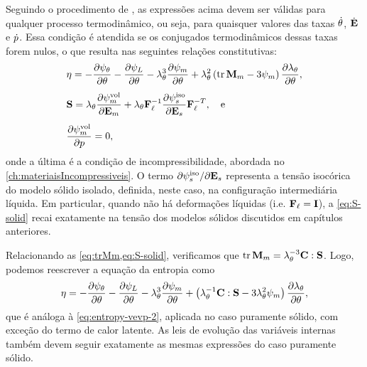 \documentclass[Tese.tex]{subfiles}
\begin{document}
Seguindo o procedimento de , as expressões acima devem ser válidas para qualquer processo termodinâmico, ou seja, para quaisquer valores das taxas $\dot{\theta}$, $\dot{\mathbf{E}}$ e $\dot{p}$. Essa condição é atendida se os conjugados termodinâmicos dessas taxas forem nulos, o que resulta nas seguintes relações constitutivas:
\begin{align}
&\eta = - \dfrac{\partial\psi_{\theta}}{\partial\theta} - \dfrac{\partial\psi_L}{\partial\theta} - \lambda_{\theta}^3\dfrac{\partial\psi_m}{\partial\theta} +  \lambda_{\theta}^2\left(\text{tr}\,\mathbf{M}_m - 3\psi_m\right)\dfrac{\partial\lambda_{\theta}}{\partial\theta}, \label{eq:entropy-solid} \\[0.15cm]
&\mathbf{S} = \lambda_{\theta}\dfrac{\partial\psi_m^\text{vol}}{\partial\mathbf{E}_m} + \lambda_{\theta}\mathbf{F}_\ell^{-1}\dfrac{\partial\psi_s^\text{iso}}{\partial\mathbf{E}_s}\mathbf{F}_\ell^{-T}, \text{\quad e} \label{eq:S-solid} \\[0.15cm]
&\dfrac{\partial\psi_m^\text{vol}}{\partial p} = 0, \label{eq:incompress-pc}
\end{align}
onde a última é a condição de incompressibilidade, abordada no \cref{ch:materiaisIncompressiveis}. O termo ${\partial\psi_s^\text{iso}}/{\partial\mathbf{E}_s}$ representa a tensão isocórica do modelo sólido isolado, definida, neste caso, na configuração intermediária líquida. Em particular, quando não há deformações líquidas (i.e. $\mathbf{F}_\ell=\mathbf{I}$), a \cref{eq:S-solid} recai exatamente na tensão dos modelos sólidos discutidos em capítulos anteriores.

Relacionando as \cref{eq:trMm,eq:S-solid}, verificamos que $\text{tr}\,\mathbf{M}_m = \lambda_{\theta}^{-3}\mathbf{C}:\mathbf{S}$. Logo, podemos reescrever a equação da entropia como
\begin{equation}
\eta = - \dfrac{\partial\psi_{\theta}}{\partial\theta} - \dfrac{\partial\psi_L}{\partial\theta} - \lambda_{\theta}^3\dfrac{\partial\psi_m}{\partial\theta} +  \left(\lambda_{\theta}^{-1}\mathbf{C}:\mathbf{S} - 3\lambda_{\theta}^2\psi_m\right)\dfrac{\partial\lambda_{\theta}}{\partial\theta}, \label{eq:entropy-solid-2}
\end{equation}
que é análoga à \cref{eq:entropy-vevp-2}, aplicada no caso puramente sólido, com exceção do termo de calor latente. As leis de evolução das variáveis internas também devem seguir exatamente as mesmas expressões do caso puramente sólido.
\end{document}
